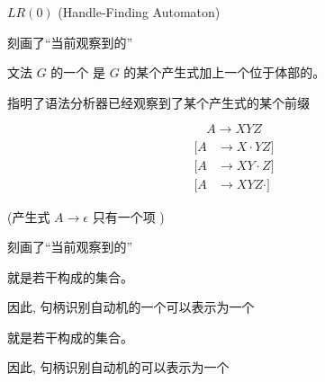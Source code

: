 \begin{frame}{}
  \begin{center}
    $LR(0)$  (Handle-Finding Automaton)

    \vspace{0.10cm}
  \end{center}
\end{frame}

\begin{frame}{}
  \begin{center}
    刻画了``当前观察到的''
  \end{center}

  \begin{definition}[$LR(0)$项 (Item)]
    文法 $G$ 的一个 是 $G$ 的某个产生式加上一个位于体部的。
  \end{definition}

  \begin{center}
    指明了语法分析器已经观察到了某个产生式的某个前缀

    \pause
    \[
      A \to XYZ
    \]
    \begin{align*}
      [A &\to \cdot XYZ] \\[6pt]
      [A &\to X \cdot YZ] \\[6pt]
      [A &\to XY \cdot Z] \\[6pt]
      [A &\to XYZ \cdot]
    \end{align*}

    (产生式 $A \to \epsilon$ 只有一个项 \blue{$[A \to \cdot]$})
  \end{center}
\end{frame}

\begin{frame}{}
  \begin{center}
    刻画了``当前观察到的''
    \vspace{0.30cm}

    \begin{definition}[项集]
      就是若干构成的集合。
    \end{definition}

    \vspace{0.30cm}
    因此, 句柄识别自动机的一个可以表示为一个

    \pause
    \vspace{0.60cm}
    \begin{definition}[项集族]
      就是若干构成的集合。
    \end{definition}

    \vspace{0.30cm}
    因此, 句柄识别自动机的可以表示为一个
  \end{center}
\end{frame}

